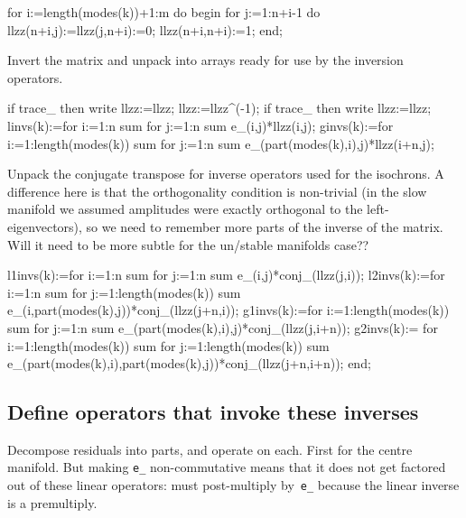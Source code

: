 \documentclass[11pt,a5paper]{article}
\begin{document}
\begin{reduce}
  for i:=length(modes(k))+1:m do begin 
    for j:=1:n+i-1 do llzz(n+i,j):=llzz(j,n+i):=0;
    llzz(n+i,n+i):=1;
  end;
\end{reduce}

Invert the matrix and unpack into arrays ready for use by the inversion operators.

\begin{reduce}
if trace_ then write llzz:=llzz; 
  llzz:=llzz^(-1);
if trace_ then write llzz:=llzz;
  linvs(k):=for i:=1:n sum for j:=1:n sum e_(i,j)*llzz(i,j);
  ginvs(k):=for i:=1:length(modes(k)) sum 
    for j:=1:n sum e_(part(modes(k),i),j)*llzz(i+n,j);
\end{reduce}

Unpack the conjugate transpose for inverse operators used for the isochrons.  
A difference here is that the orthogonality condition is non-trivial (in the slow manifold we assumed amplitudes were exactly orthogonal to the left-eigenvectors), so we need to remember more parts of the inverse of the matrix.
Will it need to be more subtle for the un/stable manifolds case??

\begin{reduce}
  l1invs(k):=for i:=1:n sum for j:=1:n sum 
      e_(i,j)*conj_(llzz(j,i));
  l2invs(k):=for i:=1:n sum for j:=1:length(modes(k)) sum 
      e_(i,part(modes(k),j))*conj_(llzz(j+n,i));
  g1invs(k):=for i:=1:length(modes(k)) sum for j:=1:n sum 
      e_(part(modes(k),i),j)*conj_(llzz(j,i+n));
  g2invs(k):=
    for i:=1:length(modes(k)) sum for j:=1:length(modes(k)) sum 
      e_(part(modes(k),i),part(modes(k),j))*conj_(llzz(j+n,i+n));
end;
\end{reduce}


\subsection{Define operators that invoke these inverses}
Decompose residuals into parts, and operate on each.
First for the centre manifold.
But making \verb|e_| non-commutative means that it does not get factored out of these linear operators: must post-multiply by~\verb|e_| because the linear inverse is a premultiply.

\end{document}
